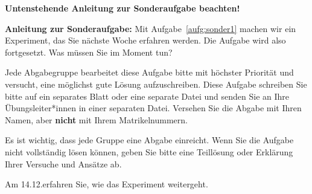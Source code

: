 \begin{center}
 {\large\textbf{Untenstehende Anleitung zur Sonderaufgabe beachten!}}
\end{center}

\bigskip


\noindent
\textbf{Anleitung zur Sonderaufgabe:} Mit Aufgabe~\ref{aufg:sonder1} machen wir ein Experiment, das Sie n\"achste Woche erfahren werden. Die Aufgabe wird also fortgesetzt. Was m\"ussen Sie im Moment tun?

Jede Abgabegruppe bearbeitet diese Aufgabe bitte mit h\"ochster Priorit\"at und versucht, eine m\"oglichst gute L\"osung aufzuschreiben. Diese Aufgabe schreiben Sie bitte auf ein separates Blatt oder eine separate Datei und senden Sie an Ihre \"Ubungsleiter*innen in einer separaten Datei. Versehen Sie die Abgabe mit Ihren Namen, aber \textbf{nicht} mit Ihrem Matrikelnummern. 

Es ist wichtig, dass jede Gruppe eine Abgabe einreicht. Wenn Sie die Aufgabe nicht vollst\"andig l\"osen k\"onnen, geben Sie bitte eine Teill\"osung oder Erkl\"arung Ihrer Versuche und Ans\"atze ab.

Am 14.12.\@ erfahren Sie, wie das Experiment weitergeht.

